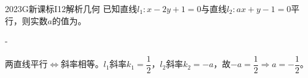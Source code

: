
\begin{problem}{2023}{G}{新课标I}{12}{解析几何}
已知直线$l_1:x-2y+1=0$与直线$l_2:ax+y-1=0$平行，则实数$a$的值为\underline{\hspace{4em}}。
\end{problem}

\begin{answer}
-
\end{answer}

\begin{solutions}
两直线平行$\Leftrightarrow$斜率相等。$l_1$斜率$k_1=\dfrac{1}{2}$，$l_2$斜率$k_2=-a$，故$-a=\dfrac{1}{2}\Rightarrow a=-\dfrac{1}{2}$。
\end{solutions}